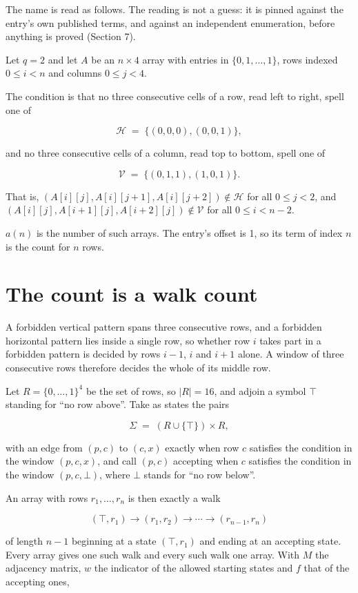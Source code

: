 \documentclass[11pt]{article}
\theoremstyle{definition}
\begin{document}
The name is read as follows. The reading is not a guess: it is pinned against the entry's own published terms, and against an independent enumeration, before anything is proved (Section 7).

Let $q = 2$ and let $A$ be an $n \times 4$ array with entries in $\{0,1,\dots,1\}$, rows indexed $0 \le i < n$ and columns $0 \le j < 4$.

The condition is that no three consecutive cells of a row, read left to right, spell one of

\[\mathcal{H} \;=\; \{(0,0,0), (0,0,1)\},\]

and no three consecutive cells of a column, read top to bottom, spell one of

\[\mathcal{V} \;=\; \{(0,1,1), (1,0,1)\}.\]

That is, $(A[i][j],A[i][j{+}1],A[i][j{+}2]) \notin \mathcal{H}$ for all $0 \le j < 2$, and $(A[i][j],A[i{+}1][j],A[i{+}2][j]) \notin \mathcal{V}$ for all $0 \le i < n-2$.

$a(n)$ is the number of such arrays. The entry's offset is 1, so its term of index $n$ is the count for $n$ rows.

\section{The count is a walk count}

A forbidden vertical pattern spans three consecutive rows, and a forbidden horizontal pattern lies inside a single row, so whether row $i$ takes part in a forbidden pattern is decided by rows $i-1$, $i$ and $i+1$ alone. A window of three consecutive rows therefore decides the whole of its middle row.

Let $R = \{0,\dots,1\}^{4}$ be the set of rows, so $|R| = 16$, and adjoin a symbol $\top$ standing for ``no row above''. Take as states the pairs

\[\Sigma \;=\; (R \cup \{\top\}) \times R,\]

with an edge from $(p,c)$ to $(c,x)$ exactly when row $c$ satisfies the condition in the window $(p,c,x)$, and call $(p,c)$ accepting when $c$ satisfies the condition in the window $(p,c,\bot)$, where $\bot$ stands for ``no row below''.

An array with rows $r_1,\dots,r_n$ is then exactly a walk

\[(\top,r_1) \to (r_1,r_2) \to \cdots \to (r_{n-1},r_n)\]

of length $n-1$ beginning at a state $(\top,r_1)$ and ending at an accepting state. Every array gives one such walk and every such walk one array. With $M$ the adjacency matrix, $w$ the indicator of the allowed starting states and $f$ that of the accepting ones,
\end{document}
